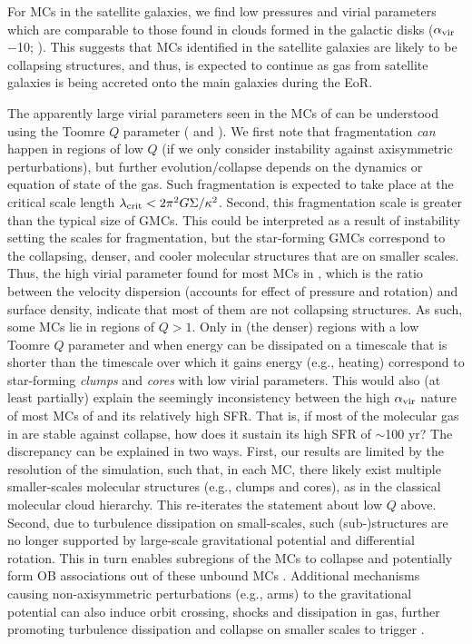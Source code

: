 \IfFileExists{emulateapjlegacy.cls}{\documentclass[iop]{emulateapjlegacy}}{\documentclass[iop]{emulateapj}}
\begin{document}
For MCs in the satellite galaxies, we find low pressures and virial parameters 
which are comparable to those found in clouds formed in the galactic disks 
($\alpha_{\rm vir}$$-$10; \citealt{Dobbs08a, Tasker09a}).
This suggests that MCs identified in the satellite galaxies are likely to be collapsing structures,
and thus, \SF is expected to continue 
as gas from satellite galaxies is being accreted onto the main galaxies during the EoR.

The apparently large virial parameters seen in the MCs of \flower can be understood using the 
Toomre $Q$ parameter ( and ). 
We first note that fragmentation {\it can} happen in regions of low $Q$ (if we only consider 
instability against axisymmetric perturbations), but  
further evolution/collapse depends on the dynamics or equation of state of the gas. 
Such fragmentation is expected to take place at the
critical scale length $\lambda_{\rm crit} < 2 \pi^2 G \Sigma / \kappa^2$.
Second, this fragmentation scale is greater than the typical size of GMCs. This could be interpreted as a result of instability setting the scales for fragmentation, but the star-forming GMCs
correspond to the collapsing, denser, and cooler molecular structures that are on smaller scales. 
Thus, the high virial parameter found 
for most MCs in \flower, which is the ratio between the velocity dispersion (accounts for effect of pressure 
and rotation) and surface density, indicate that most of them are not collapsing structures. 
As such, some MCs lie in regions of $Q>1$. 
Only in (the denser) regions with a low Toomre $Q$ parameter and 
when energy can be dissipated on a timescale 
that is shorter than the timescale over which it gains energy (e.g., heating) 
correspond to star-forming {\it clumps} and {\it cores} with low virial parameters.
This would also (at least partially) explain the seemingly inconsistency between the high $\alpha_{\rm vir}$
nature of most MCs of \flower and its relatively high SFR.
That is, if most of the molecular gas in \flower are stable against collapse, 
how does it sustain its high SFR of $\sim$100\,\Msun\,yr\pmOne?
The discrepancy can be explained in two ways.
First, our results are limited by the resolution of the simulation, such that, in each MC, there
likely exist multiple smaller-scales molecular structures (e.g., clumps and cores),
as in the classical molecular cloud hierarchy. This re-iterates the statement about low $Q$ above.
Second, due to turbulence dissipation on small-scales, such (sub-)structures are no longer supported by
large-scale gravitational potential and differential rotation.
This in turn enables subregions of the MCs to collapse and potentially form OB associations out of these unbound
MCs \citep{Clark04a, Clark05a}.
Additional mechanisms causing non-axisymmetric perturbations (e.g., arms) to the gravitational potential
can also induce orbit crossing, shocks and dissipation in gas, further promoting turbulence dissipation
and collapse on smaller scales to trigger \SF.
\end{document}
